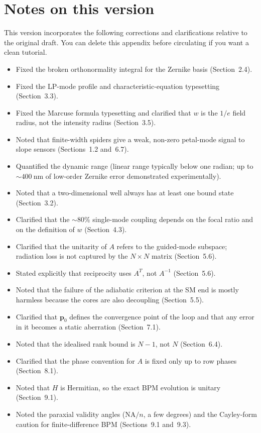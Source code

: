 \documentclass[11pt,a4paper]{article}
\newcommand{\pvec}{\mathbf{p}}
\begin{document}
\section{Notes on this version}
This version incorporates the following corrections and clarifications relative to the original draft. You can delete this appendix before circulating if you want a clean tutorial.
\begin{itemize}
\item Fixed the broken orthonormality integral for the Zernike basis (Section~2.4).
\item Fixed the LP-mode profile and characteristic-equation typesetting (Section~3.3).
\item Fixed the Marcuse formula typesetting and clarified that $w$ is the $1/e$ field radius, not the intensity radius (Section~3.5).
\item Noted that finite-width spiders give a weak, non-zero petal-mode signal to slope sensors (Sections~1.2 and~6.7).
\item Quantified the dynamic range (linear range typically below one radian; up to $\sim\SI{400}{\nano\meter}$ of low-order Zernike error demonstrated experimentally).
\item Noted that a two-dimensional well always has at least one bound state (Section~3.2).
\item Clarified that the $\sim 80\%$ single-mode coupling depends on the focal ratio and on the definition of $w$ (Section~4.3).
\item Clarified that the unitarity of $A$ refers to the guided-mode subspace; radiation loss is not captured by the $N\times N$ matrix (Section~5.6).
\item Stated explicitly that reciprocity uses $A^T$, not $A^{-1}$ (Section~5.6).
\item Noted that the failure of the adiabatic criterion at the SM end is mostly harmless because the cores are also decoupling (Section~5.5).
\item Clarified that $\pvec_0$ defines the convergence point of the loop and that any error in it becomes a static aberration (Section~7.1).
\item Noted that the idealised rank bound is $N-1$, not $N$ (Section~6.4).
\item Clarified that the phase convention for $A$ is fixed only up to row phases (Section~8.1).
\item Noted that $H$ is Hermitian, so the exact BPM evolution is unitary (Section~9.1).
\item Noted the paraxial validity angles ($\mathrm{NA}/n$, a few degrees) and the Cayley-form caution for finite-difference BPM (Sections~9.1 and~9.3).

\end{itemize}
\end{document}
